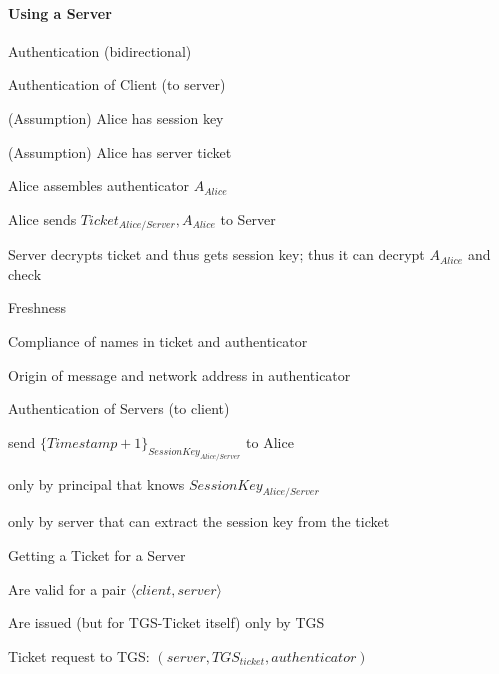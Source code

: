 \documentclass[a4paper]{article}
\begin{document}
\begin{multicols}{3}
    \paragraph{Using a Server}
    Authentication (bidirectional)
    \begin{enumerate*}
        \item Authentication of Client (to server)
        \begin{itemize*}
            \item (Assumption) Alice has session key
            \item (Assumption) Alice has server ticket
        \end{itemize*}
        \begin{enumerate*}
            \item Alice assembles authenticator $A_{Alice}$ %
            \item Alice sends $Ticket_{Alice/Server}, A_{Alice}$ to Server
            \item Server decrypts ticket and thus gets session key; thus it can decrypt $A_{Alice}$ and check
            \begin{itemize*}
                \item Freshness
                \item Compliance of names in ticket and authenticator
                \item Origin of message and network address in authenticator
            \end{itemize*}
        \end{enumerate*}
        \item Authentication of Servers (to client)
        \begin{itemize*}
            \item send $\{Timestamp+1\}_{SessionKey_{Alice/Server}}$ to Alice
            \item only by principal that knows $SessionKey_{Alice/Server}$
            \item only by server that can extract the session key from the ticket %
        \end{itemize*}
    \end{enumerate*}

    Getting a Ticket for a Server
    \begin{itemize*}
        \item Are valid for a pair $\langle client, server\rangle$
        \item Are issued (but for TGS-Ticket itself) only by TGS
        \item Ticket request to TGS: $(server, TGS_{ticket}, authenticator)$
    \end{itemize*}


\end{multicols}
\end{document}
